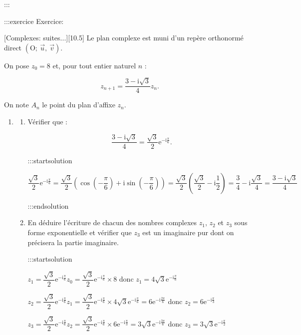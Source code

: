 \documentclass{cornouaille}
\begin{document}
:::



:::exercice Exercice:

[Complexes: suites...][10.5]
Le plan complexe est muni d'un repère orthonormé direct $\left(\text{O};~\overrightarrow{u},~\overrightarrow{v}\right)$.

On pose $z_0 = 8$ et, pour tout entier naturel $n$ :


$$
z_{n+1} = \dfrac{3 - \text{i}\sqrt{3}}{4}z_n.
$$


On note $A_n$ le point du plan d'affixe $z_n$.

\medskip


\begin{enumerate}
\item

\begin{enumerate}
\item Vérifier que :


$$
\dfrac{3 - \text{i}\sqrt{3}}{4} = \dfrac{\sqrt{3}}{2}\text{e}^{- \text{i}\frac{\pi}{6}}.
$$



:::startsolution

$\dfrac{\sqrt{3}}{2} \text{e}^{-\text{i} \frac{\pi}{6}} = \dfrac{\sqrt{3}}{2} \left( \cos\left(-\dfrac{\pi}{6}\right) + \text{i}\sin\left(-\dfrac{\pi}{6}\right) \right) = \dfrac{\sqrt{3}}{2} \left( \dfrac{\sqrt{3}}{2} - \text{i}\dfrac{1}{2} \right) = \dfrac{3}{4} - \text{i} \dfrac{\sqrt{3}}{4} = \dfrac{3-\text{i}\sqrt{3}}{4}$


:::endsolution
\item En déduire l'écriture de chacun des nombres complexes $z_1$,  $z_2$ et $z_3$ sous forme exponentielle et vérifier que $z_3$ est un imaginaire pur dont on précisera la partie imaginaire.


:::startsolution

$z_1=\dfrac{\sqrt{3}}{2} \text{e}^{-\text{i} \frac{\pi}{6}}z_0=\dfrac{\sqrt{3}}{2} \text{e}^{-\text{i} \frac{\pi}{6}} \times 8$ donc $\boxed{ z_1=4\sqrt{3} \text{e}^{-\text{i} \frac{\pi}{6}} }$\smallskip

$z_2=\dfrac{\sqrt{3}}{2} \text{e}^{-\text{i} \frac{\pi}{6}}z_1 = \dfrac{\sqrt{3}}{2} \text{e}^{-\text{i} \frac{\pi}{6}} \times 4\sqrt{3} \text{e}^{-\text{i} \frac{\pi}{6}} = 6 \text{e}^{-\text{i} \frac{2\pi}{6}}$ donc $\boxed{ z_2=6 \text{e}^{-\text{i} \frac{\pi}{3}} }$\smallskip

$z_3=\dfrac{\sqrt{3}}{2} \text{e}^{-\text{i} \frac{\pi}{6}}z_2 = \dfrac{\sqrt{3}}{2} \text{e}^{-\text{i} \frac{\pi}{6}} \times 6 \text{e}^{-\text{i} \frac{\pi}{3}} = 3\sqrt{3} \text{e}^{-\text{i} \frac{3\pi}{6}}$ donc $\boxed{ z_3=3\sqrt{3} \text{e}^{-\text{i} \frac{\pi}{2}} }$\medskip


\end{enumerate}
\end{enumerate}
\end{document}
